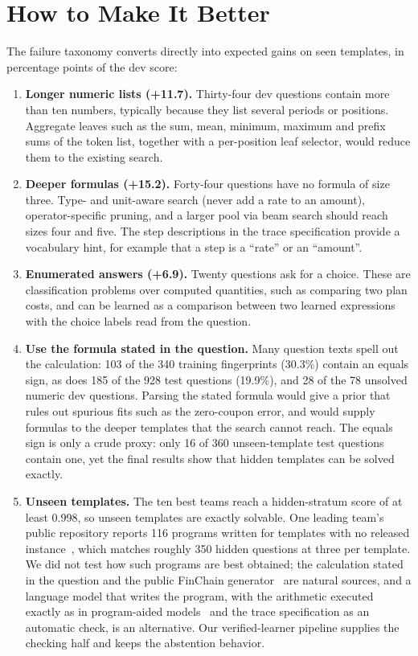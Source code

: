 \documentclass[conference]{IEEEtran}
\begin{document}
\section{How to Make It Better}
\label{sec_future}
The failure taxonomy converts directly into expected gains on seen templates,
in percentage points of the dev score:
\begin{enumerate}
  \item \textbf{Longer numeric lists (+11.7).} Thirty-four dev questions contain
        more than ten numbers, typically because they list several periods or
        positions. Aggregate leaves such as the sum, mean, minimum, maximum and
        prefix sums of the token list, together with a per-position leaf
        selector, would reduce them to the existing search.
  \item \textbf{Deeper formulas (+15.2).} Forty-four questions have no formula
        of size three. Type- and unit-aware search (never add a rate to an
        amount), operator-specific pruning, and a larger pool via beam search
        should reach sizes four and five. The step descriptions in the trace
        specification provide a vocabulary hint, for example that a step is a
        ``rate'' or an ``amount''.
  \item \textbf{Enumerated answers (+6.9).} Twenty questions ask for a choice.
        These are classification problems over computed quantities, such as
        comparing two plan costs, and can be learned as a comparison between
        two learned expressions with the choice labels read from the question.
  \item \textbf{Use the formula stated in the question.} Many question texts
        spell out the calculation: 103 of the 340 training fingerprints (30.3\%)
        contain an equals sign, as does 185 of the 928 test questions (19.9\%),
        and 28 of the 78 unsolved numeric dev questions. Parsing the stated
        formula would give a prior that rules out spurious fits such as the
        zero-coupon error, and would supply formulas to the deeper templates
        that the search cannot reach. The equals sign is only a crude proxy:
        only 16 of 360 unseen-template test questions contain one, yet the
        final results show that hidden templates can be solved exactly.
  \item \textbf{Unseen templates.} The ten best teams reach a hidden-stratum
        score of at least 0.998, so unseen templates are exactly solvable. One
        leading team's public repository reports 116 programs written for
        templates with no released instance~\cite{patodiya2026repo}, which
        matches roughly 350 hidden questions at three per template. We did not
        test how such programs are best obtained; the calculation stated in the
        question and the public FinChain generator~\cite{xie-etal-2026-finchain}
        are natural sources, and a language model that writes the program, with
        the arithmetic executed exactly as in program-aided
        models~\cite{gao2023pal} and the trace specification as an automatic
        check, is an alternative. Our verified-learner pipeline supplies the
        checking half and keeps the abstention behavior.
\end{enumerate}
\end{document}
